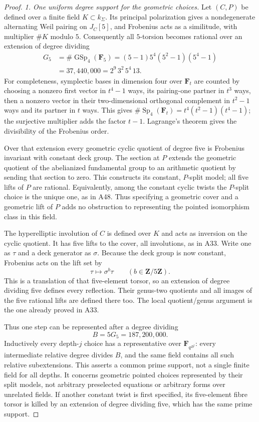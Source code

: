 \documentclass[11pt,a4paper]{article}
\begin{document}
\begin{proof}
\emph{1. One uniform degree support for the geometric choices.}
Let $(C,P)$ be defined over a finite field $K\subset k_\Sigma$.
Its principal polarization gives a nondegenerate alternating Weil
pairing on $J_C[5]$, and Frobenius acts as a similitude, with
multiplier $\#K$ modulo $5$. Consequently all $5$-torsion becomes
rational over an extension of degree dividing
\[
 \begin{aligned}
 G_5&=\#\operatorname{GSp}_4(\mathbf F_5)
      =(5-1)5^4(5^2-1)(5^4-1)\\
    &=37{,}440{,}000=2^9\,3^2\,5^4\,13.
 \end{aligned}
 \tag{FI.2}
\]
For completeness, symplectic bases in dimension four over
$\mathbf F_t$ are counted by choosing a nonzero first vector
in $t^4-1$ ways, its pairing-one partner in $t^3$ ways, then
a nonzero vector in their two-dimensional orthogonal complement
in $t^2-1$ ways and its partner in $t$ ways. This gives
$\#\operatorname{Sp}_4(\mathbf F_t)=t^4(t^2-1)(t^4-1)$;
the surjective multiplier adds the factor $t-1$.
Lagrange's theorem gives the divisibility of the Frobenius order.

Over that extension every geometric cyclic quotient of degree five is
Frobenius invariant with constant deck group. The section at $P$
extends the geometric quotient of the abelianized fundamental group
to an arithmetic quotient by sending that section to zero. This
constructs its constant, $P$-split model; all five lifts of $P$
are rational. Equivalently, among the constant cyclic twists the
$P$-split choice is the unique one, as in A48. Thus specifying a
geometric cover and a geometric lift of $P$ adds no obstruction
to representing the pointed isomorphism class in this field.

The hyperelliptic involution of $C$ is defined over $K$ and acts
as inversion on the cyclic quotient. It has five lifts to the
cover, all involutions, as in A33. Write one as $\tau$ and a deck
generator as $\sigma$. Because the deck group is now constant,
Frobenius acts on the lift set by
\[
                  \tau\longmapsto\sigma^b\tau
                  \qquad(b\in\mathbf Z/5\mathbf Z).
 \tag{FI.3}
\]
This is a translation of that five-element torsor, so an extension
of degree dividing five defines every reflection. Their genus-two
quotients and all images of the five rational lifts are defined
there too. The local quotient/genus argument is the one already
proved in A33.

Thus one step can be represented after a degree dividing
\[
                  B=5G_5=187{,}200{,}000.
 \tag{FI.4}
\]
Inductively every depth-$j$ choice has a representative over
$\mathbf F_{q^{B^j}}$: every intermediate relative degree divides
$B$, and the same field contains all such relative subextensions.
This asserts a common prime support, not a single finite field
for all depths. It concerns geometric pointed choices represented
by their split models, not arbitrary preselected equations or
arbitrary forms over unrelated fields. If another constant twist
is first specified, its five-element fibre torsor is killed by
an extension of degree dividing five, which has the same prime
support.


\end{proof}
\end{document}
